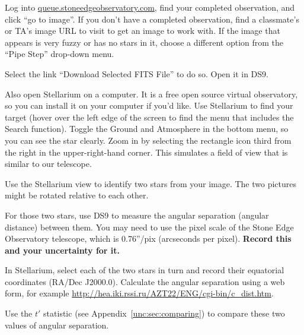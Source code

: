 \begin{steps}
	\item Log into \url{queue.stoneedgeobservatory.com}, find your completed observation, and click ``go to image''. If you don't have a completed observation, find a classmate's or TA's image URL to visit to get an image to work with. If the image that appears is very fuzzy or has no stars in it, choose a different option from the ``Pipe Step'' drop-down menu.
	
	\item Select the link ``Download Selected FITS File'' to do so. Open it in DS9.
	
	\item Also open Stellarium on a computer. It is a free open source virtual observatory, so you can install it on your computer if you'd like. Use Stellarium to find your target (hover over the left edge of the screen to find the menu that includes the Search function). Toggle the Ground and Atmosphere in the bottom menu, so you can see the star clearly. Zoom in by selecting the rectangle icon third from the right in the upper-right-hand corner. This simulates a field of view that is similar to our telescope.
	
	\item Use the Stellarium view to identify two stars from your image. The two pictures might be rotated relative to each other.
	
	\item For those two stars, use DS9 to measure the angular separation (angular distance) between them. You may need to use the pixel scale of the Stone Edge Observatory telescope, which is 0.76''/pix (arcseconds per pixel). \textbf{Record this and your uncertainty for it.}
	
	\item In Stellarium, select each of the two stars in turn and record their equatorial coordinates (RA/Dec J2000.0). Calculate the angular separation using a web form, for example \url{http://hea.iki.rssi.ru/AZT22/ENG/cgi-bin/c_dist.htm}.
	
	\item Use the $t'$ statistic (see Appendix\ \ref{unc:sec:comparing}) to compare these two values of angular separation.
	
	
\end{steps}

